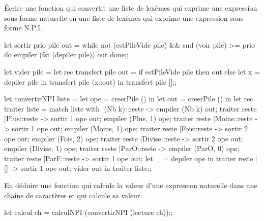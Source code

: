 \begin{question}{}{}
Écrire une fonction  qui convertit une liste de lexèmes qui exprime une expression sous forme naturelle en une liste de lexèmes qui exprime une expression sous forme N.P.I.

\reponse

\begin{ocaml}
let sortir prio pile out =
    while not (estPileVide pile) && snd (voir pile) >= prio do
       empiler (fst (depiler pile)) out done;;  
       
let vider pile =
   let rec transfert pile out =
      if estPileVide pile
      then out
      else let x = depiler pile in transfert pile (x::out)
   in transfert pile [];;  
\end{ocaml}
\newpage           
\begin{ocaml}
let convertirNPI liste =
   let ope = creerPile () in
   let out = creerPile () in
   let rec traiter liste =
      match liste with
      |(Nb k)::reste -> empiler (Nb k) out; 
                        traiter reste
      |Plus::reste -> sortir 1 ope out;
                      empiler (Plus, 1) ope;
                      traiter reste
      |Moins::reste -> sortir 1 ope out;
                       empiler (Moins, 1) ope;
                       traiter reste
      |Fois::reste -> sortir 2 ope out;
                      empiler (Fois, 2) ope;
                      traiter reste
      |Divise::reste -> sortir 2 ope out;
                        empiler (Divise, 1) ope;
                        traiter reste
      |ParO::reste -> empiler (ParO, 0) ope; 
                      traiter reste
      |ParF::reste -> sortir 1 ope out;
                      let _ = depiler ope in traiter reste
      |[] -> sortir 1 ope out;
             vider out
   in traiter liste;;
\end{ocaml}
\end{question}
\begin{question}{}{}
En déduire une fonction  qui calcule la valeur d'une expression naturelle dans une chaîne de caractères et qui calcule sa valeur.

\reponse

\begin{ocaml}
let calcul ch =
   calculNPI (convertirNPI (lecture ch));;
\end{ocaml}
\end{question}
